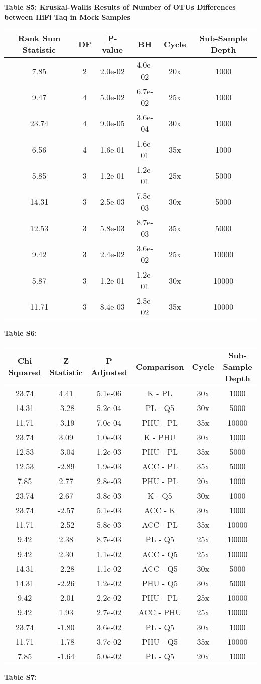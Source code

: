 \documentclass[12pt,]{article}
\begin{document}
\newpage

\textbf{Table S5: Kruskal-Wallis Results of Number of OTUs Differences
between HiFi Taq in Mock Samples}

\begin{longtable}[]{@{}cccccc@{}}
\toprule
Rank Sum Statistic & DF & P-value & BH & Cycle & Sub-Sample
Depth\tabularnewline
\midrule
\endhead
7.85 & 2 & 2.0e-02 & 4.0e-02 & 20x & 1000\tabularnewline
9.47 & 4 & 5.0e-02 & 6.7e-02 & 25x & 1000\tabularnewline
23.74 & 4 & 9.0e-05 & 3.6e-04 & 30x & 1000\tabularnewline
6.56 & 4 & 1.6e-01 & 1.6e-01 & 35x & 1000\tabularnewline
5.85 & 3 & 1.2e-01 & 1.2e-01 & 25x & 5000\tabularnewline
14.31 & 3 & 2.5e-03 & 7.5e-03 & 30x & 5000\tabularnewline
12.53 & 3 & 5.8e-03 & 8.7e-03 & 35x & 5000\tabularnewline
9.42 & 3 & 2.4e-02 & 3.6e-02 & 25x & 10000\tabularnewline
5.87 & 3 & 1.2e-01 & 1.2e-01 & 30x & 10000\tabularnewline
11.71 & 3 & 8.4e-03 & 2.5e-02 & 35x & 10000\tabularnewline
\bottomrule
\end{longtable}

\newpage

\textbf{Table S6: }

\begin{longtable}[]{@{}cccccc@{}}
\toprule
Chi Squared & Z Statistic & P Adjusted & Comparison & Cycle & Sub-Sample
Depth\tabularnewline
\midrule
\endhead
23.74 & 4.41 & 5.1e-06 & K - PL & 30x & 1000\tabularnewline
14.31 & -3.28 & 5.2e-04 & PL - Q5 & 30x & 5000\tabularnewline
11.71 & -3.19 & 7.0e-04 & PHU - PL & 35x & 10000\tabularnewline
23.74 & 3.09 & 1.0e-03 & K - PHU & 30x & 1000\tabularnewline
12.53 & -3.04 & 1.2e-03 & PHU - PL & 35x & 5000\tabularnewline
12.53 & -2.89 & 1.9e-03 & ACC - PL & 35x & 5000\tabularnewline
7.85 & 2.77 & 2.8e-03 & PHU - PL & 20x & 1000\tabularnewline
23.74 & 2.67 & 3.8e-03 & K - Q5 & 30x & 1000\tabularnewline
23.74 & -2.57 & 5.1e-03 & ACC - K & 30x & 1000\tabularnewline
11.71 & -2.52 & 5.8e-03 & ACC - PL & 35x & 10000\tabularnewline
9.42 & 2.38 & 8.7e-03 & PL - Q5 & 25x & 10000\tabularnewline
9.42 & 2.30 & 1.1e-02 & ACC - Q5 & 25x & 10000\tabularnewline
14.31 & -2.28 & 1.1e-02 & ACC - Q5 & 30x & 5000\tabularnewline
14.31 & -2.26 & 1.2e-02 & PHU - Q5 & 30x & 5000\tabularnewline
9.42 & -2.01 & 2.2e-02 & PHU - PL & 25x & 10000\tabularnewline
9.42 & 1.93 & 2.7e-02 & ACC - PHU & 25x & 10000\tabularnewline
23.74 & -1.80 & 3.6e-02 & PL - Q5 & 30x & 1000\tabularnewline
11.71 & -1.78 & 3.7e-02 & PHU - Q5 & 35x & 10000\tabularnewline
7.85 & -1.64 & 5.0e-02 & PL - Q5 & 20x & 1000\tabularnewline
\bottomrule
\end{longtable}

\newpage

\textbf{Table S7: }
\end{document}
